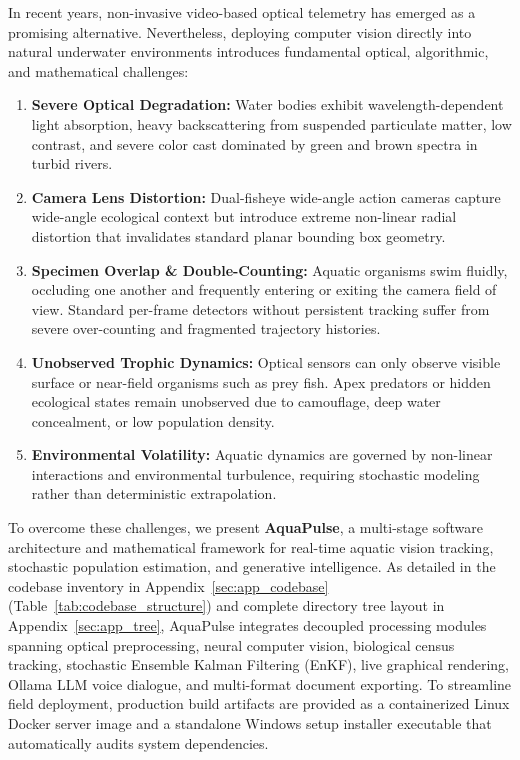 \documentclass[11pt,a4paper]{article}
\newcommand{\refblue}[1]{{\color{linkblue}\ref{#1}}}
\begin{document}
In recent years, non-invasive video-based optical telemetry has emerged as a promising alternative. Nevertheless, deploying computer vision directly into natural underwater environments introduces fundamental optical, algorithmic, and mathematical challenges:
\begin{enumerate}
    \item \textbf{Severe Optical Degradation:} Water bodies exhibit wavelength-dependent light absorption, heavy backscattering from suspended particulate matter, low contrast, and severe color cast dominated by green and brown spectra in turbid rivers.
    \item \textbf{Camera Lens Distortion:} Dual-fisheye wide-angle action cameras capture wide-angle ecological context but introduce extreme non-linear radial distortion that invalidates standard planar bounding box geometry.
    \item \textbf{Specimen Overlap \& Double-Counting:} Aquatic organisms swim fluidly, occluding one another and frequently entering or exiting the camera field of view. Standard per-frame detectors without persistent tracking suffer from severe over-counting and fragmented trajectory histories.
    \item \textbf{Unobserved Trophic Dynamics:} Optical sensors can only observe visible surface or near-field organisms such as prey fish. Apex predators or hidden ecological states remain unobserved due to camouflage, deep water concealment, or low population density.
    \item \textbf{Environmental Volatility:} Aquatic dynamics are governed by non-linear interactions and environmental turbulence, requiring stochastic modeling rather than deterministic extrapolation.
\end{enumerate}

To overcome these challenges, we present \textbf{AquaPulse}, a multi-stage software architecture and mathematical framework for real-time aquatic vision tracking, stochastic population estimation, and generative intelligence. As detailed in the codebase inventory in Appendix~\refblue{sec:app_codebase} (Table~\refblue{tab:codebase_structure}) and complete directory tree layout in Appendix~\refblue{sec:app_tree}, AquaPulse integrates decoupled processing modules spanning optical preprocessing, neural computer vision, biological census tracking, stochastic Ensemble Kalman Filtering (EnKF), live graphical rendering, Ollama LLM voice dialogue, and multi-format document exporting. To streamline field deployment, production build artifacts are provided as a containerized Linux Docker server image and a standalone Windows setup installer executable that automatically audits system dependencies.
\end{document}
